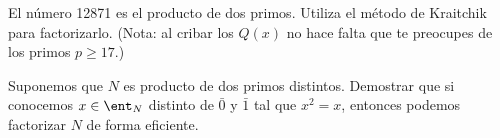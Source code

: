 \begin{problem}[7]
El número 12871 es el producto de dos
primos. Utiliza el método de Kraitchik para factorizarlo.
(Nota: al cribar los $Q(x)$ no hace falta que te preocupes de los
primos $p\ge 17$.)
\solution
\end{problem}


\begin{problem}[8]
Suponemos que $N$ es producto de dos primos distintos.
Demostrar que si conocemos  $x\in \ent_N$ distinto de $\bar 0$ y
$\bar 1$ tal que $x^2=x$, entonces podemos factorizar $N$ de forma
eficiente.
\solution
\end{problem}



